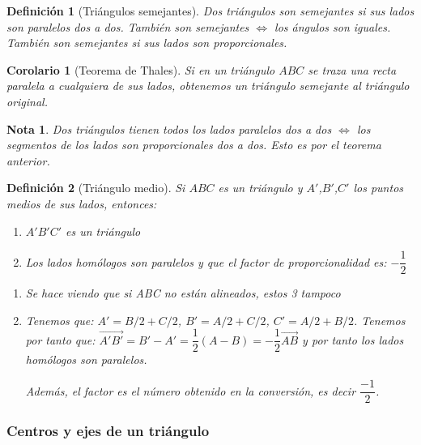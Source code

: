\documentclass[11pt, a4paper, titlepage]{article}
\makeatletter
\renewenvironment{proof}[1][\proofname] {\vspace{-15pt}\par\pushQED{\qed}\normalfont\topsep6\p@\@plus6\p@\relax\trivlist\item[\hskip\labelsep\it#1\@addpunct{.}]\ignorespaces}{\popQED\endtrivlist\@endpefalse}
\renewcommand{\vec}{\overrightarrow}
\theoremstyle{theorem-style}
\newtheorem{ncor}{Corolario}
\theoremstyle{definition-style}
\newtheorem*{ndef}{Definición}
\theoremstyle{remark-style}
\newtheorem*{nota}{Nota}
\theoremstyle{example-style}
\newenvironment{nlist}
{\begin{enumerate}
    \renewcommand\labelenumi{(\emph{\roman{enumi})}}}
  {\end{enumerate}}
\makeatother
\begin{document}
\begin{ndef}[Triángulos semejantes]
  Dos triángulos son semejantes si sus lados son paralelos dos a dos. También son semejantes $\iff$ los ángulos son iguales. También son semejantes si sus lados son proporcionales.
\end{ndef}

\begin{ncor}[Teorema de Thales]
  Si en un triángulo $ABC$ se traza una recta paralela a cualquiera de sus lados, obtenemos un triángulo semejante al triángulo original.
\end{ncor}

\begin{nota}
  Dos triángulos tienen todos los lados paralelos dos a dos $\iff$ los segmentos de los lados son proporcionales dos a dos. Esto es por el teorema anterior.
\end{nota}

\begin{ndef}[Triángulo medio]
  Si $ABC$ es un triángulo y $A'$,$B'$,$C'$ los puntos medios de sus lados, entonces:
  \begin{nlist}
  \item $A'B'C'$ es un triángulo
  \item Los lados homólogos son paralelos y que el factor de proporcionalidad es: $-\dfrac{1}{2}$
  \end{nlist}\vspace{0.2cm}
  \begin{proof}

    \begin{nlist}
    \item Se hace viendo que si ABC no están alineados, estos 3 tampoco
    \item Tenemos que: $A' = B/2 + C/2$, $B' = A/2+C/2$, $C' = A/2 + B/2$. Tenemos por tanto que: $\vec{A'B'} = B'-A' = \dfrac{1}{2}(A-B) = -\dfrac{1}{2} \vec{AB}$ y por tanto los lados homólogos son paralelos.

      Además, el factor es el número obtenido en la conversión, es decir $\dfrac{-1}{2}$.
    \end{nlist}
  \end{proof}
\end{ndef}


\subsubsection{Centros y ejes de un triángulo}
\end{document}
